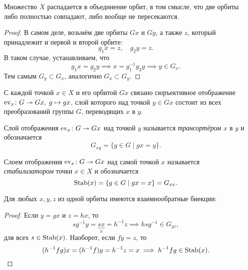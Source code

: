 
\begin{proposition}
    Множество $X$ распадается в объединение орбит, в том смысле, что две орбиты либо полностью совпадают, либо вообще не пересекаются. 
\end{proposition}
\begin{proof}
    В самом деле, возьмём две орбиты $Gx$ и $Gy$, а также $z$, который принадлежит и первой и второй орбите: \[g_1x = z, \quad g_2y = z.\]
    В таком случае, устанавливаем, что $$g_1x = g_2y \implies x = g_1^{-1}g_2y \implies y \in G_x.$$
    Тем самым $G_y \subset G_x$, аналогично $G_x \subset G_y$.
\end{proof}

С каждой точкой $x \in X$ и его орбитой $Gx$ связано сюръективное отображение $\operatorname{ev}_x \colon G \twoheadrightarrow Gx,\; g \mapsto gx$, слой которого над точкой $y \in Gx$ состоит из всех преобразований группы $G$, переводящих $x$ в $y$. 
\begin{definition}
    [Транспортёр]
    Слой отображения $\operatorname{ev}_x \colon G \twoheadrightarrow Gx$ над точкой $y$ называется \emph{трансортёром} $x$ в $y$ и обозначается \[G_{xy} = \{g \in G \mid gx = y\}.\]
\end{definition}
\begin{definition}[Стабилизатор]
    Слоем отображения $\operatorname{ev}_x \colon G \twoheadrightarrow Gx$ над самой точкой $x$ называется \emph{стабилизатором} точки $x \in X$ и обозначается \[ \operatorname{Stab}(x) = \{g \in G \mid gx = x \} = G_{xx}.\]
\end{definition}


\begin{lemma}\label{lem:orb_trans}
    Для любых $x, y, z$ из одной орбиты имеются взаимнообратные биекции:
    \begin{center}
    \end{center}
\end{lemma}
\begin{proof}
    Если $y = gx$ и $z = hx$, то $$sg^{-1}y = \underbrace{sx}_{x} = h^{-1}z \implies hsg^{-1} \in G_{yz}, $$
    для всех $s \in \operatorname{Stab}(x)$. Наоборот, если $fy = z$, то \[
        (h^{-1}fg)x = (h^{-1}f)y = {h^{-1}}z = x \implies h^{-1}fg \in \operatorname{Stab}(x).
    \]
\end{proof}

